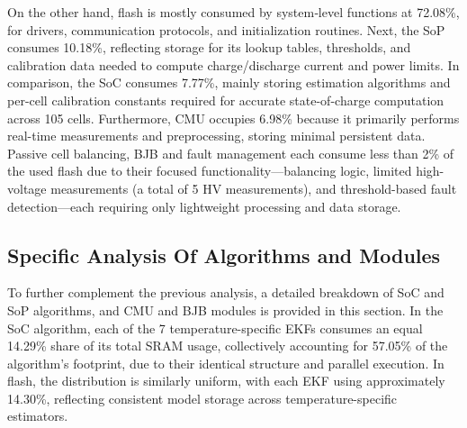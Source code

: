 On the other hand, flash is mostly consumed by system‑level functions at 72.08\%, for drivers, communication protocols, and initialization routines. Next, the SoP consumes 10.18\%, reflecting storage for its lookup tables, thresholds, and calibration data needed to compute charge/discharge current and power limits. In comparison, the SoC consumes 7.77\%, mainly storing estimation algorithms and per-cell calibration constants required for accurate state-of-charge computation across 105 cells. Furthermore, CMU occupies 6.98\% because it primarily performs real-time measurements and preprocessing, storing minimal persistent data. Passive cell balancing, BJB and fault management each consume less than 2\% of the used flash due to their focused functionality—balancing logic, limited high-voltage measurements (a total of 5 HV measurements), and threshold-based fault detection—each requiring only lightweight processing and data storage.
\subsection{Specific Analysis Of Algorithms and Modules}
To further complement the previous analysis, a detailed breakdown of SoC and SoP algorithms, and CMU and BJB modules is provided in this section. In the SoC algorithm, each of the 7 temperature-specific EKFs consumes an equal 14.29\% share of its total SRAM usage, collectively accounting for 57.05\% of the algorithm’s footprint, due to their identical structure and parallel execution. In flash, the distribution is similarly uniform, with each EKF using approximately 14.30\%, reflecting consistent model storage across temperature-specific estimators.

